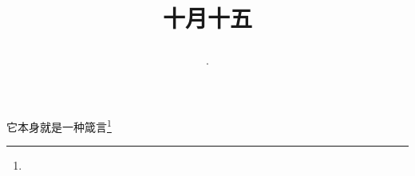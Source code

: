 \title{\date[d=15,m=11,y=2024][year:cn-y,年,month:cn,day:cn,日,·,weekday]·十月十五 }
它本身就是一种箴言\footnote{ }

